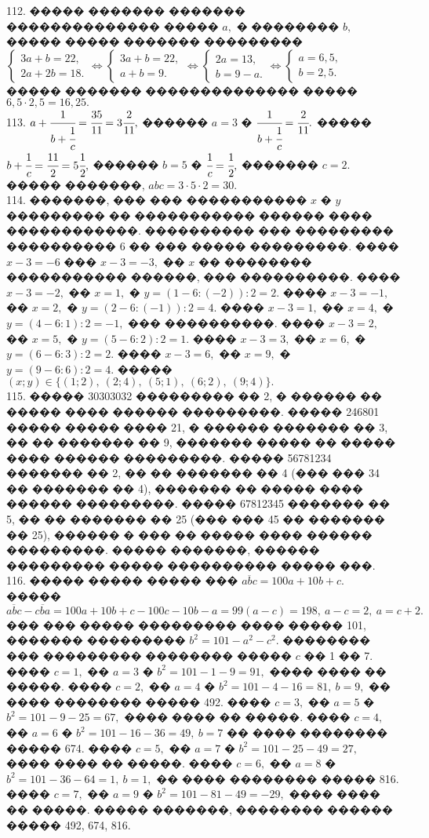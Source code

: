 \documentclass[12pt]{article}
\begin{document}
112. ����� ������� ������� �������������� ����� $a,$ � �������� $b,$ ����� ����� ������� ��������� $\begin{cases} 3a+b=22,\\ 2a+2b=18.\end{cases}\Leftrightarrow
\begin{cases} 3a+b=22,\\ a+b=9.\end{cases}\Leftrightarrow
\begin{cases} 2a=13,\\ b=9-a.\end{cases}\Leftrightarrow
\begin{cases} a=6,5,\\ b=2,5.\end{cases}$ ����� ������� �������������� ����� $6,5\cdot2,5=16,25.$\\
113. $a+\cfrac{1}{b+\cfrac{1}{c}}=\cfrac{35}{11}=3\cfrac{2}{11},$ ������ $a=3$ � $\cfrac{1}{b+\cfrac{1}{c}}=\cfrac{2}{11}.$ ����� $b+\cfrac{1}{c}=\cfrac{11}{2}=5\cfrac{1}{2},$ ������ $b=5$ � $\cfrac{1}{c}=\cfrac{1}{2},$ ������� $c=2.$ ����� �������, $abc=3\cdot5\cdot2=30.$\\
114. �������, ��� ��� ����������� $x$ � $y$ ��������� �� ����������� ������ ���� ������������. ���������� ��� ��������� ���������� 6 �� ��� ����� ���������. ���� $x-3=-6$ ��� $x-3=-3,$ �� $x$ �� �������� ����������� ������, ��� ����������. ���� $x-3=-2,$ �� $x=1,$ � $y=(1-6:(-2)):2=2.$ ���� $x-3=-1,$ �� $x=2,$ � $y=(2-6:(-1)):2=4.$ ���� $x-3=1,$ �� $x=4,$ � $y=(4-6:1):2=-1,$ ��� ����������. ���� $x-3=2,$ �� $x=5,$ � $y=(5-6:2):2=1.$ ���� $x-3=3,$ �� $x=6,$ � $y=(6-6:3):2=2.$ ���� $x-3=6,$ �� $x=9,$ � $y=(9-6:6):2=4.$ ����� $(x;y)\in\{(1;2),\ (2;4),\ (5;1),\ (6;2),\ (9;4)\}.$\\
115. ����� 30303032 ��������� �� 2, � ������ �� ����� ���� ������ ���������. ����� 246801 ����� ����� ���� 21, � ������ ������� �� 3, �� �� ������� �� 9, ������� ����� �� ����� ���� ������ ���������. ����� 56781234 ������� �� 2, �� �� ������� �� 4 (��� ��� 34 �� ������� �� 4), ������� �� ����� ���� ������ ���������. ����� 67812345 ������� �� 5, �� �� ������� �� 25 (��� ��� 45 �� ������� �� 25), ������ � ��� �� ����� ���� ������ ���������. ����� �������, ������ ��������� ����� ���������� ����� ���.\\
116. ����� ����� ����� ��� $\overline{abc}=100a+10b+c.$ ����� $\overline{abc}-\overline{cba}=100a+10b+c-100c-10b-a=99(a-c)=198,\ a-c=2,\ a=c+2.$ ��� ��� ����� ��������� ���� ����� 101, ������� ��������� $b^2=101-a^2-c^2.$ �������� ��� ��������� �������� ����� $c$ �� 1 �� 7. ���� $c=1,$ �� $a=3$ � $b^2=101-1-9=91,$ ���� ���� �� �����. ���� $c=2,$ �� $a=4$ � $b^2=101-4-16=81,\ b=9,$ �� ���� �������� ����� 492. ���� $c=3,$ �� $a=5$ � $b^2=101-9-25=67,$ ���� ���� �� �����. ���� $c=4,$ �� $a=6$ � $b^2=101-16-36=49,\ b=7$ �� ���� �������� ����� 674. ���� $c=5,$ �� $a=7$ � $b^2=101-25-49=27,$ ���� ���� �� �����. ���� $c=6,$ �� $a=8$ � $b^2=101-36-64=1,\ b=1,$ �� ���� �������� ����� 816. ���� $c=7,$ �� $a=9$ � $b^2=101-81-49=-29,$ ���� ���� �� �����. ����� �������, �������� ������ ����� 492, 674, 816.\\
\end{document}
